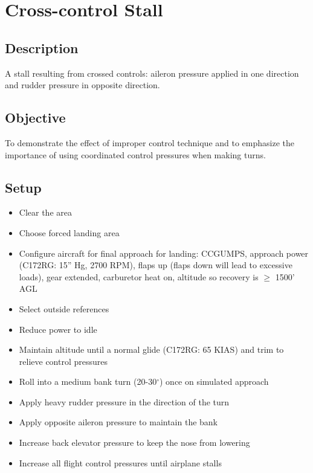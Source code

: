 \section{Cross-control Stall}

\subsection{Description}

A stall resulting from crossed controls: aileron pressure applied in one
direction and rudder pressure in opposite direction.

\subsection{Objective}

To demonstrate the effect of improper control technique and to emphasize the
importance of using coordinated control pressures when making turns.

\subsection{Setup}

\begin{itemize}
  \item Clear the area
  \item Choose forced landing area
  \item Configure aircraft for final approach for landing: CCGUMPS, approach
    power (C172RG: 15'' Hg, 2700 RPM), flaps up (flaps down will lead to
    excessive loads), gear extended, carburetor heat on, altitude so recovery
    is $\geq$ 1500' AGL
  \item Select outside references
  \item Reduce power to idle
  \item Maintain altitude until a normal glide (C172RG: 65 KIAS) and trim to
    relieve control pressures
  \item Roll into a medium bank turn (20-30$^\circ$) once on simulated approach
  \item Apply heavy rudder pressure in the direction of the turn
  \item Apply opposite aileron pressure to maintain the bank
  \item Increase back elevator pressure to keep the nose from lowering
  \item Increase all flight control pressures until airplane stalls
\end{itemize}


